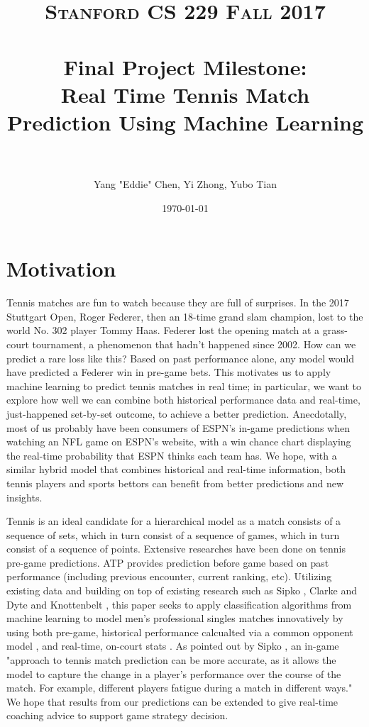 \documentclass[paper=a4, fontsize=11pt]{scrartcl} %
\title{	
\normalfont \normalsize 
\textsc{Stanford CS 229 Fall 2017} \\ [25pt] %
\horrule{0.5pt} \\[0.4cm] %
\Large Final Project Milestone: \\
\Large Real Time Tennis Match Prediction Using Machine Learning\\ %
\horrule{2pt} \\[0.5cm] %
}
\author{Yang "Eddie" Chen, Yi Zhong, Yubo Tian} %
\date{\normalsize\today} %
\numberwithin{equation}{section} %
\numberwithin{figure}{section} %
\numberwithin{table}{section} %
\begin{document}
\maketitle %


\section{Motivation}
Tennis matches are fun to watch because they are full of surprises. In the 2017 Stuttgart Open, Roger Federer, then an 18-time grand slam champion, lost to the world No. 302 player Tommy Haas. Federer lost the opening match at a grass-court tournament, a phenomenon that hadn't happened since 2002. How can we predict a rare loss like this? Based on past performance alone, any model would have predicted a Federer win in pre-game bets. This motivates us to apply machine learning to predict tennis matches in real time; in particular, we want to explore how well we can combine both historical performance data and real-time, just-happened set-by-set outcome, to achieve a better prediction. Anecdotally, most of us probably have been consumers of ESPN’s in-game predictions when watching an NFL game on ESPN’s website, with a win chance chart displaying the real-time probability that ESPN thinks each team has. We hope, with a similar hybrid model that combines historical and real-time information, both tennis players and sports bettors can benefit from better predictions and new insights. 

Tennis is an ideal candidate for a hierarchical model as a match consists of a sequence of sets, which in turn consist of a sequence of games, which in turn consist of a sequence of points. Extensive researches have been done on tennis pre-game predictions. ATP provides prediction before game based on past performance (including previous encounter, current ranking, etc). Utilizing existing data and building on top of existing research such as Sipko \cite{tennis1}, Clarke and Dyte \cite{Clarke2010} and Knottenbelt \cite{KNOTTENBELT20123820}, this paper seeks to apply classification algorithms from machine learning to model men's professional singles matches innovatively by using both pre-game, historical performance calcualted via a common opponent model \cite{KNOTTENBELT20123820}, and real-time, on-court stats \cite{tennis_charting} \cite{tennis2setbyset}. As pointed out by Sipko \cite{tennis1}, an in-game "approach to tennis match prediction can be more accurate, as it allows the model to capture the change in a player's performance over the course of the match. For example, different players fatigue during a match in different ways." We hope that results from our predictions can be extended to give real-time coaching advice to support game strategy decision.
\end{document}
